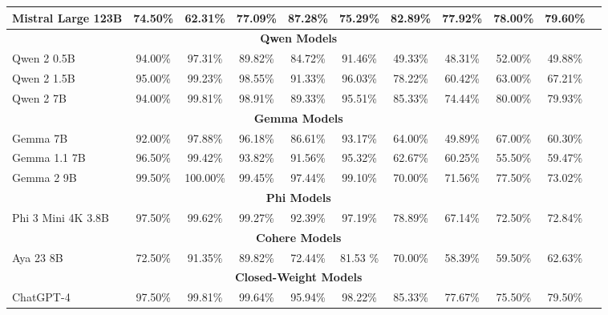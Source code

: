 \documentclass[11pt]{article}
\begin{document}
\begin{table}[ht]
{\begin{tabular}{@{}lccccc|ccccc@{}}
        Mistral Large 123B  & 74.50\% & \cellcolor{red!20}62.31\% & 77.09\% & 87.28\% & 75.29\% & 82.89\% & \cellcolor{green!20}77.92\% & \cellcolor{yellow!20}78.00\% & 79.60\% \\
        \midrule
        \multicolumn{10}{c}{\textbf{Qwen Models}} \\
        Qwen 2 0.5B      & 94.00\% & 97.31\% & 89.82\% & 84.72\% & 91.46\% & 49.33\% & 48.31\% & 52.00\% & 49.88\% \\
        Qwen 2 1.5B      & 95.00\% & 99.23\% & 98.55\% & 91.33\% & 96.03\% & 78.22\% & 60.42\% & 63.00\% & 67.21\% \\
        Qwen 2 7B        & 94.00\% & \cellcolor{yellow!20}99.81\% & 98.91\% & 89.33\% & 95.51\% & 85.33\% & 74.44\% & \cellcolor{green!20}80.00\% & \cellcolor{yellow!20}79.93\% \\
        \midrule
        \multicolumn{10}{c}{\textbf{Gemma Models}} \\
        Gemma 7B         & 92.00\% & 97.88\% & 96.18\% & 86.61\% & 93.17\% & 64.00\% & 49.89\% & 67.00\% & 60.30\% \\
        Gemma 1.1 7B     & 96.50\% & 99.42\% & 93.82\% & 91.56\% & 95.32\% & 62.67\% & 60.25\% & 55.50\% & 59.47\% \\
        Gemma 2 9B       & \cellcolor{green!20}99.50\% & \cellcolor{green!20}100.00\% & \cellcolor{yellow!20}99.45\% & \cellcolor{green!20}97.44\% & \cellcolor{green!20}99.10\% & 70.00\% & 71.56\% & 77.50\% & 73.02\% \\
        \midrule
        \multicolumn{10}{c}{\textbf{Phi Models}} \\
        Phi 3 Mini 4K 3.8B    & 97.50\% & 99.62\% & 99.27\% & 92.39\% & 97.19\% & 78.89\% & 67.14\% & 72.50\% & 72.84\% \\
        \midrule
        \multicolumn{10}{c}{\textbf{Cohere Models}} \\
        Aya 23 8B        & 72.50\% & 91.35\% & 89.82\% & \cellcolor{red!20}72.44\% & 81.53 \% & 70.00\% & 58.39\% & 59.50\% & 62.63\% \\
        \midrule \midrule
        \multicolumn{10}{c}{\textbf{Closed-Weight Models}} \\ %
        ChatGPT-4               & \cellcolor{red!20}97.50\% & \cellcolor{red!20}99.81\% & \cellcolor{red!20}99.64\% & \cellcolor{red!20}95.94\% & \cellcolor{red!20}98.22\% & \cellcolor{green!20}85.33\% & \cellcolor{green!20}77.67\% & \cellcolor{green!20}75.50\% & \cellcolor{green!20}79.50\%\\

\end{tabular}}
\end{table}
\end{document}
